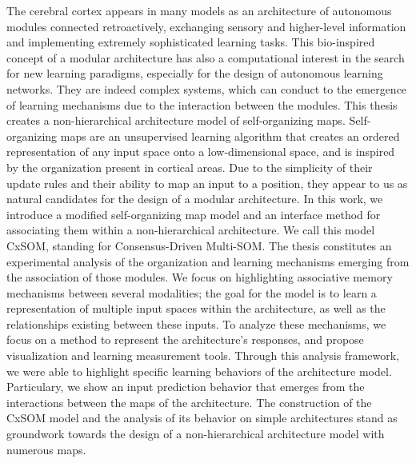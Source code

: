 \documentclass[11pt]{thesul-cs}
\begin{document}
\begin{ThesisAbstract}
\begin{FrenchAbstract}
  \end{FrenchAbstract}

  \begin{EnglishAbstract}
The cerebral cortex appears in many models as an architecture of autonomous modules connected retroactively, exchanging sensory and higher-level information and implementing extremely sophisticated learning tasks. 
This bio-inspired concept of a modular architecture has also a computational interest in the search for new learning paradigms, especially for the design of autonomous learning networks. They are indeed complex systems, which can conduct to the emergence of learning mechanisms due to the interaction between the modules.
This thesis creates a non-hierarchical architecture model of self-organizing maps.
Self-organizing maps are an unsupervised learning algorithm that creates an ordered representation of any input space onto a low-dimensional space, and is inspired by the organization present in cortical areas. 
Due to the simplicity of their update rules and their ability to map an input to a position, they appear to us as natural candidates for the design of a modular architecture.
In this work, we introduce a modified self-organizing map model and an interface method for associating them within a non-hierarchical architecture. We call this model CxSOM, standing for Consensus-Driven Multi-SOM.
The thesis constitutes an experimental analysis of the organization and learning mechanisms emerging from the association of those modules. 
We focus on highlighting associative memory mechanisms between several modalities; the goal for the model is to learn a representation of multiple input spaces within the architecture, as well as the relationships existing between these inputs.
To analyze these mechanisms, we focus on a method to represent the architecture's responses, and propose visualization and learning measurement tools. Through this analysis framework, we were able to highlight specific learning behaviors of the architecture model. Particulary, we show an input prediction behavior that emerges from the interactions between the maps of the architecture.
The construction of the CxSOM model and the analysis of its behavior on simple architectures stand as groundwork towards the design of a non-hierarchical architecture model with numerous maps.
   
    \end{EnglishAbstract}
  \end{ThesisAbstract}
\end{document}
